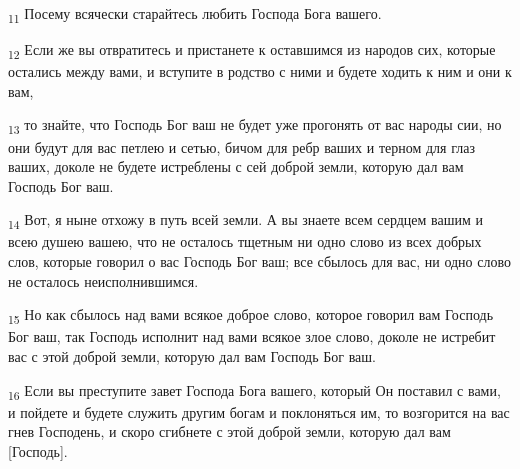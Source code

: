 \begin{tcolorbox}
\textsubscript{11} Посему всячески старайтесь любить Господа Бога вашего.
\end{tcolorbox}
\begin{tcolorbox}
\textsubscript{12} Если же вы отвратитесь и пристанете к оставшимся из народов сих, которые остались между вами, и вступите в родство с ними и будете ходить к ним и они к вам,
\end{tcolorbox}
\begin{tcolorbox}
\textsubscript{13} то знайте, что Господь Бог ваш не будет уже прогонять от вас народы сии, но они будут для вас петлею и сетью, бичом для ребр ваших и терном для глаз ваших, доколе не будете истреблены с сей доброй земли, которую дал вам Господь Бог ваш.
\end{tcolorbox}
\begin{tcolorbox}
\textsubscript{14} Вот, я ныне отхожу в путь всей земли. А вы знаете всем сердцем вашим и всею душею вашею, что не осталось тщетным ни одно слово из всех добрых слов, которые говорил о вас Господь Бог ваш; все сбылось для вас, ни одно слово не осталось неисполнившимся.
\end{tcolorbox}
\begin{tcolorbox}
\textsubscript{15} Но как сбылось над вами всякое доброе слово, которое говорил вам Господь Бог ваш, так Господь исполнит над вами всякое злое слово, доколе не истребит вас с этой доброй земли, которую дал вам Господь Бог ваш.
\end{tcolorbox}
\begin{tcolorbox}
\textsubscript{16} Если вы преступите завет Господа Бога вашего, который Он поставил с вами, и пойдете и будете служить другим богам и поклоняться им, то возгорится на вас гнев Господень, и скоро сгибнете с этой доброй земли, которую дал вам [Господь].
\end{tcolorbox}
